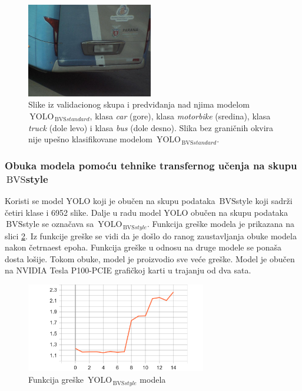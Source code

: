 \documentclass[12pt,oneside]{memoir}
\newcommand{\yolo}{\ensuremath{\,\textrm{YOLO}}}
\newcommand{\bvs}{\ensuremath{\,\textrm{BVS}}}
\begin{document}
\begin{figure}[!htbp]
  \includegraphics[width=0.49\textwidth]{matfmaster/yolo/v4/basic_augmentation/bus_0.jpg}
\caption{Slike iz validacionog skupa i predviđanja nad njima modelom  $\yolo_{\bvs{standard}}$, klasa \textit{car} (gore), klasa \textit{motorbike} (sredina), klasa \textit{truck} (dole levo) i klasa \textit{bus} (dole desno). Slika bez graničnih okvira nije upešno klasifikovane modelom $\yolo_{\bvs{standard}}$.}\label{fig:YOLOv4_basaug}
\end{figure}


\subsubsection{Obuka modela pomoću tehnike transfernog učenja na skupu \bvs{style}}

Koristi se model YOLO koji je obučen na skupu podataka \bvs{style} koji sadrži četiri klase i 6952 slike. Dalje u radu model YOLO obučen na skupu podataka \bvs{style} se označava sa $\yolo_{\bvs{style}}$. Funkcija greške modela je prikazana na slici \ref{fig:section4_yolo4styleaug_loss}. Iz funkcije greške se vidi da je došlo do ranog zaustavljanja obuke modela nakon četrnaest epoha. Funkcija greške u odnosu na druge modele se ponaša dosta lošije. Tokom obuke, model je proizvodio sve veće greške. Model je obučen na NVIDIA Tesla P100-PCIE grafičkoj karti u trajanju od dva sata.

\begin{figure}[!htbp]
\centering
  \includegraphics[width=0.70\textwidth]{matfmaster/yolo/v4/stylegan_augmentation/epoch_loss.png}
\caption{Funkcija greške $\yolo_{\bvs{style}}$ modela}\label{fig:section4_yolo4styleaug_loss}
\end{figure}
\end{document}
